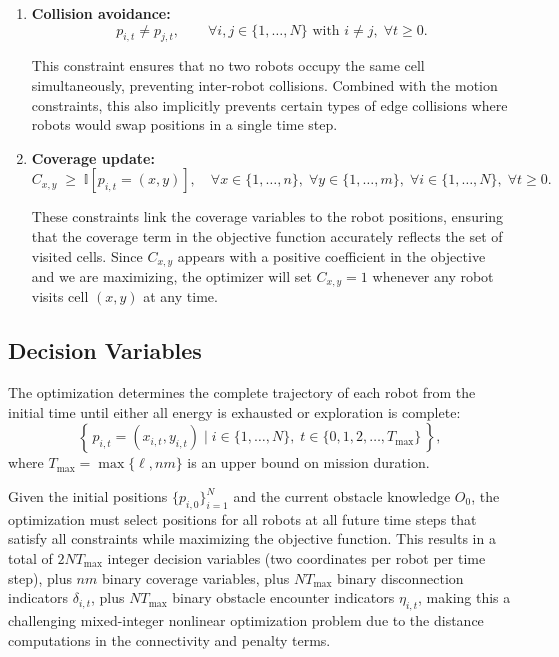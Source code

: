 \begin{enumerate}
    \item \textbf{Collision avoidance:}
    \[
        p_{i,t} \neq p_{j,t}, \qquad \forall i,j \in \{1,\ldots,N\} \text{ with } i \neq j,\; \forall t \ge 0.
    \]
    
    This constraint ensures that no two robots occupy the same cell simultaneously, preventing inter-robot collisions. Combined with the motion constraints, this also implicitly prevents certain types of edge collisions where robots would swap positions in a single time step.
    
    \item \textbf{Coverage update:}
    \[
        C_{x,y} \;\ge\; \mathbb{I}\!\left[p_{i,t} = (x,y)\right], \quad \forall x \in \{1,\ldots,n\},\; \forall y \in \{1,\ldots,m\},\; \forall i \in \{1,\ldots,N\},\; \forall t \ge 0.
    \]
    
    These constraints link the coverage variables to the robot positions, ensuring that the coverage term in the objective function accurately reflects the set of visited cells. Since $C_{x,y}$ appears with a positive coefficient in the objective and we are maximizing, the optimizer will set $C_{x,y}=1$ whenever any robot visits cell $(x,y)$ at any time.
\end{enumerate}

\subsection*{Decision Variables}

The optimization determines the complete trajectory of each robot from the initial time until either all energy is exhausted or exploration is complete:
\[
    \left\{\, p_{i,t} = (x_{i,t}, y_{i,t}) \;\big|\; i \in \{1,\ldots,N\},\; t \in \{0,1,2,\ldots,T_{\text{max}}\} \,\right\},
\]
where $T_{\text{max}} = \max\{\ell, nm\}$ is an upper bound on mission duration.

Given the initial positions $\{p_{i,0}\}_{i=1}^N$ and the current obstacle knowledge $O_0$, the optimization must select positions for all robots at all future time steps that satisfy all constraints while maximizing the objective function. This results in a total of $2NT_{\text{max}}$ integer decision variables (two coordinates per robot per time step), plus $nm$ binary coverage variables, plus $NT_{\text{max}}$ binary disconnection indicators $\delta_{i,t}$, plus $NT_{\text{max}}$ binary obstacle encounter indicators $\eta_{i,t}$, making this a challenging mixed-integer nonlinear optimization problem due to the distance computations in the connectivity and penalty terms.

